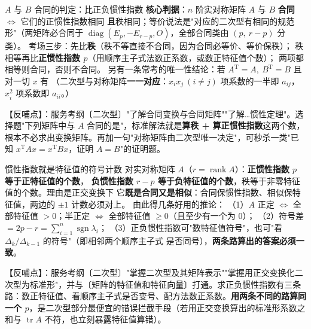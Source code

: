 \begin{fdeep}{$A$ 与 $B$ 合同的判定：比正负惯性指数}
\textbf{核心判据}：$n$ 阶实对称矩阵 $A$ 与 $B$ \textbf{合同} $\iff$ 它们的正惯性指数相同
\textbf{且}秩相同；等价说法是"对应的二次型有相同的规范形"（两矩阵必合同于
$\operatorname{diag}(E_p,-E_{r-p},O)$，全部合同类由 $(p,\ r-p)$ 分类）。
考场三步：先比\textbf{秩}（秩不等直接不合同，因为合同必等价、等价保秩）；
秩相等再比\textbf{正惯性指数 $p$}（用顺序主子式法数正系数，或数正特征值个数）；
两项都相等则合同，否则不合同。
另有一条常考的唯一性结论：若 $A^{\mathrm T}=A,\ B^{\mathrm T}=B$ 且对一切 $x$ 有
（二次型与对称矩阵\textbf{一一对应}：$x_ix_j\ (i\ne j)$ 项系数的一半即 $a_{ij}$，$x_i^{2}$ 项系数即 $a_{ii}$。）

【反哺点】：服务考纲〔二次型〕"了解合同变换与合同矩阵""了解…惯性定理"。选择题"下列矩阵中与 $A$ 合同的是"，标准解法就是\textbf{算秩 + 算正惯性指数}这两个数，根本不必求出变换矩阵。再加一句"对称矩阵由二次型唯一决定"，可秒杀一类"已知 $x^{\mathrm T}Ax=x^{\mathrm T}Bx$，证明 $A=B$"的证明题。
\end{fdeep}

\begin{fdeep}{惯性指数就是特征值的符号计数}
对实对称矩阵 $A$（$r=\operatorname{rank}A$）：\textbf{正惯性指数 $p$ 等于正特征值的个数}，
\textbf{负惯性指数 $r-p$ 等于负特征值的个数}，秩等于非零特征值的个数。理由是正交变换下
它\textbf{既是合同又是相似}：合同保惯性指数、相似保特征值，两边的 $\pm1$ 计数必须对上。
由此得几条好用的推论：
（1）$A$ 正定 $\iff$ 全部特征值 $>0$；半正定 $\iff$ 全部特征值 $\ge0$（且至少有一个为 $0$）；
（2）符号差 $=2p-r=\sum_{i=1}^{n}\operatorname{sgn}\lambda_i$；
（3）正负惯性指数可"数特征值符号"，也可"看 $\Delta_k/\Delta_{k-1}$ 的符号"（即相邻两个顺序主子式
是否同号），\textbf{两条路算出的答案必须一致}。

【反哺点】：服务考纲〔二次型〕"掌握二次型及其矩阵表示""掌握用正交变换化二次型为标准形"，并与〔矩阵的特征值和特征向量〕打通。求正负惯性指数有三条路：数正特征值、看顺序主子式是否变号、配方法数正系数。\textbf{用两条不同的路算同一个 $p$}，是二次型部分最便宜的错误拦截手段（若用正交变换算出的标准形系数之和与 $\operatorname{tr}A$ 不符，也立刻暴露特征值算错）。
\end{fdeep}

